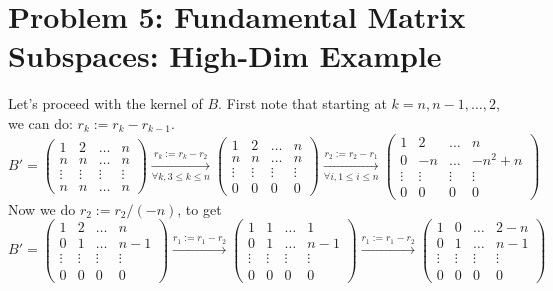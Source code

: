 \documentclass{article}
\begin{document}
\section*{Problem 5: Fundamental Matrix Subspaces: High-Dim Example}
Let's proceed with the kernel of $B$. First note that starting at $k = n, n-1, \dots,2$, we can do: $r_{k} := r_{k} - r_{k-1}$. 
\begin{equation*}
    B' = \begin{pmatrix}
        1 & 2 & \dots & n\\
        n & n & \dots & n\\
        \vdots & \vdots & \vdots & \vdots\\
        n & n & \dots & n
    \end{pmatrix} \xrightarrow[\forall k, 3\leq k \leq n]{r_{k} := r_{k} - r_{2}} 
    \begin{pmatrix}
        1 & 2 & \dots & n\\
        n & n & \dots & n\\
        \vdots & \vdots & \vdots & \vdots\\
        0 & 0 & 0 & 0
    \end{pmatrix} \xrightarrow[\forall i, 1\leq i \leq n]{r_{2} := r_{2} - r_{1}}
    \begin{pmatrix}
        1 & 2 & \dots & n\\
        0 & -n & \dots & -n^{2} + n\\
        \vdots & \vdots & \vdots & \vdots\\
        0 & 0 & 0 & 0
    \end{pmatrix}
\end{equation*}
Now we do $r_{2} := r_{2}/(-n)$, to get
\begin{equation*}
    B' = \begin{pmatrix}
        1 & 2 & \dots & n\\
        0 & 1 & \dots& n - 1\\
        \vdots & \vdots & \vdots & \vdots\\
        0 & 0 & 0 & 0
    \end{pmatrix} \xrightarrow{r_{1}:= r_{1} - r_{2}}  \begin{pmatrix}
        1 & 1 & \dots & 1\\
        0 & 1 & \dots& n - 1\\
        \vdots & \vdots & \vdots & \vdots\\
        0 & 0 & 0 & 0
    \end{pmatrix}\xrightarrow{r_{1}:= r_{1} - r_{2}} \begin{pmatrix}
        1 & 0 & \dots & 2-n\\
        0 & 1 & \dots& n - 1\\
        \vdots & \vdots & \vdots & \vdots\\
        0 & 0 & 0 & 0
    \end{pmatrix}
\end{equation*}
\end{document}
